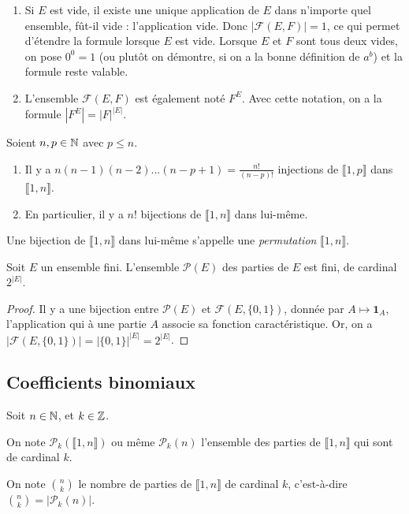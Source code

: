 \begin{remarque}
\begin{enumerate}
\item Si $E$ est vide, il existe une unique application de $E$ dans n'importe quel ensemble, fût-il vide : l'application vide. Donc $|\mathcal F(E,F)|=1$, ce qui permet d'étendre la formule lorsque $E$ est vide. Lorsque $E$ et $F$ sont tous deux vides, on pose $0^0=1$ (ou plutôt on démontre, si on a la \og bonne\fg{} définition de $a^b$) et la formule reste valable.
\item L'ensemble $\mathcal F(E,F)$ est également noté $F^E$. Avec cette notation, on a la formule $\left| F^E\right| = |F|^{|E|}$.
\end{enumerate}
\end{remarque}

\begin{proposition}
Soient $n, p\in \mathbb{N}$ avec $p\leq n$.
\begin{enumerate}
\item Il y a $n(n-1)(n-2)...(n-p+1)=\frac{n!}{(n-p)!}$ injections de $\llbracket 1,p\rrbracket$ dans $\llbracket 1,n\rrbracket$.
\item En particulier, il y a $n!$ bijections de $\llbracket 1,n\rrbracket$ dans lui-même.
\end{enumerate}
\end{proposition}

Une bijection de $\llbracket 1,n\rrbracket$ dans lui-même s'appelle une \emph{permutation} $\llbracket 1,n\rrbracket$.

\begin{proposition}
Soit $E$ un ensemble fini. L'ensemble $\mathcal P(E)$ des parties de $E$ est fini, de cardinal $2^{|E|}$.
\end{proposition}
\begin{proof}
Il y a une bijection entre $\mathcal P(E)$ et $\mathcal F(E,\{0,1\})$, donnée par $A\mapsto \mathbf{1}_A$, l'application qui à une partie $A$ associe sa fonction caractéristique. Or, on a $|\mathcal F(E,\{0,1\})| = |\{0,1\}|^{|E|} =2^{|E|} $.
\end{proof}

\subsection{Coefficients binomiaux}

\begin{definition}
Soit $n\in\mathbb{N}$, et $k\in \mathbb{Z}$. 

On note $\mathcal P_k(\llbracket 1,n\rrbracket)$ ou même $\mathcal P_k(n)$ l'ensemble des parties de $\llbracket 1,n\rrbracket$ qui sont de cardinal $k$.

On note $\binom{n}{k}$ le nombre de parties de $\llbracket 1,n\rrbracket$ de cardinal $k$, c'est-à-dire $\binom{n}{k}=|\mathcal P_k(n)|$.
\end{definition}

